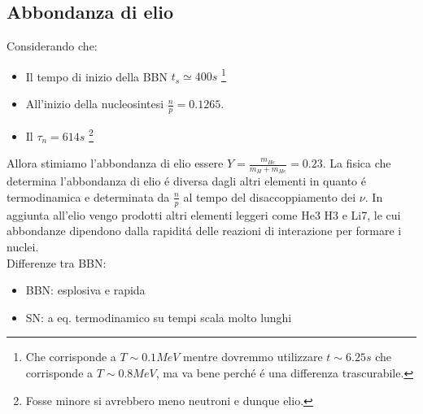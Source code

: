 \documentclass[12pt, a4paper]{article}
\begin{document}
\subsection{Abbondanza di elio}
Considerando che:
\begin{itemize}
    \item Il tempo di inizio della BBN $t_s\simeq 400 s$ \footnote{Che corrisponde a $T\sim0.1 MeV$ mentre dovremmo utilizzare $t\sim 6.25 s$ che corrisponde a $T\sim0.8 MeV$, ma va bene perch\'{e} \'{e} una differenza trascurabile.}
    \item All'inizio della nucleosintesi $\frac{n}{p}=0.1265$.
    \item Il $\tau_n = 614s$ \footnote{Fosse minore si avrebbero meno neutroni e dunque elio.}
\end{itemize}
Allora stimiamo l'abbondanza di elio essere $Y=\frac{m_{He}}{m_H+m_{He}}=0.23$. La fisica che determina l'abbondanza di elio \'{e} diversa dagli altri elementi in quanto \'{e} termodinamica e determinata da $\frac{n}{p}$ al tempo del disaccoppiamento dei $\nu$. In aggiunta all'elio vengo prodotti altri elementi leggeri come He3 H3 e Li7, le cui abbondanze dipendono dalla rapidit\'{a} delle reazioni di interazione per formare i nuclei.\\
Differenze tra BBN:
\begin{itemize}
    \item BBN: esplosiva e rapida
    \item SN: a eq. termodinamico su tempi scala molto lunghi
\end{itemize}
\end{document}
